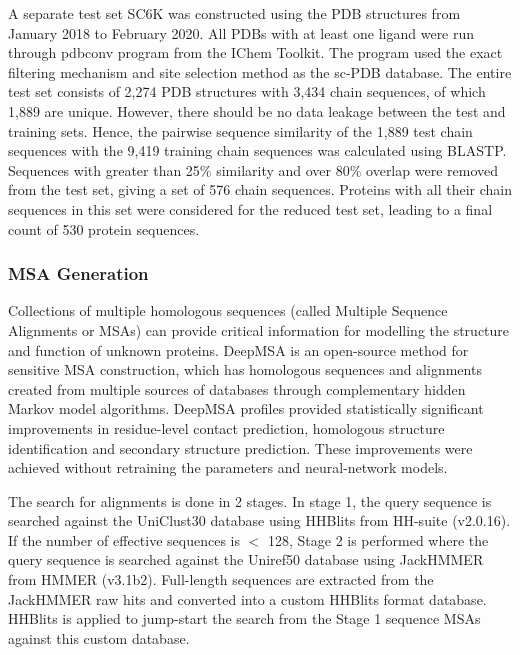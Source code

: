 \documentclass[journal=jcisd8,manuscript=article]{achemso}
\begin{document}
A separate test set SC6K was constructed using the PDB structures from January 2018 to February 2020. All PDBs with at least one ligand were run through pdbconv program from the IChem Toolkit\cite{da2018ichem}. The program used the exact filtering mechanism and site selection method as the sc-PDB\cite{desaphy2015sc} database. The entire test set consists of 2,274 PDB structures with 3,434 chain sequences, of which 1,889 are unique. However, there should be no data leakage between the test and training sets. Hence, the pairwise sequence similarity of the 1,889 test chain sequences with the 9,419 training chain sequences was calculated using BLASTP. Sequences with greater than 25\% similarity and over 80\% overlap were removed from the test set, giving a set of 576 chain sequences. Proteins with all their chain sequences in this set were considered for the reduced test set, leading to a final count of 530 protein sequences.

\subsubsection{MSA Generation}
\label{msa_generation}
\quad Collections of multiple homologous sequences (called Multiple Sequence Alignments or MSAs) can provide critical information for modelling the structure and function of unknown proteins. DeepMSA\cite{zhang2020deepmsa} is an open-source method for sensitive MSA construction, which has homologous sequences and alignments created from multiple sources of databases through complementary hidden Markov model algorithms. DeepMSA profiles provided statistically significant improvements in residue-level contact prediction, homologous structure identification and secondary structure prediction. These improvements were achieved without retraining the parameters and neural-network models.

The search for alignments is done in 2 stages. In stage 1, the query sequence is searched against the UniClust30\cite{mirdita2017uniclust} database using HHBlits from HH-suite\cite{remmert2012hhblits} (v2.0.16). If the number of effective sequences is $<$ 128, Stage 2 is performed where the query sequence is searched against the Uniref50\cite{suzek2015uniref} database using JackHMMER from HMMER\cite{johnson2010hidden} (v3.1b2). Full-length sequences are extracted from the JackHMMER raw hits and converted into a custom HHBlits format database. HHBlits is applied to jump-start the search from the Stage 1 sequence MSAs against this custom database.
\end{document}

